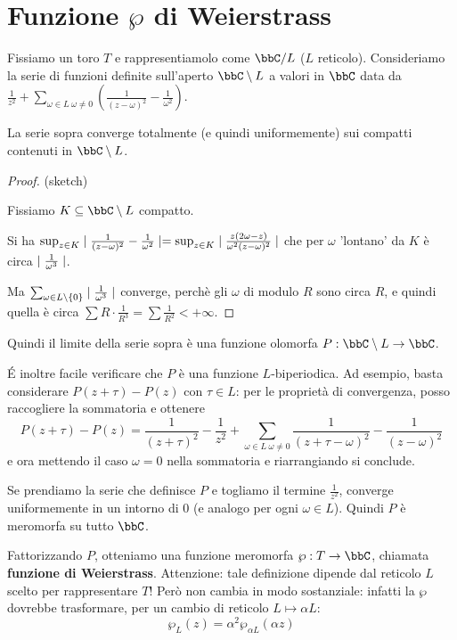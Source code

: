 \section{Funzione $\wp$ di Weierstrass}


Fissiamo un toro $T$ e rappresentiamolo come $\bbC/L$ ($L$ reticolo).
Consideriamo la serie di funzioni definite sull'aperto $\bbC\setminus L$ a valori in $\bbC$ data da $\frac{1}{z^2}+\sum_{\omega\in L\ \omega\not=0}(\frac{1}{(z-\omega)^2}-\frac{1}{\omega^2})$.

\begin{proposizione}
La serie sopra converge totalmente (e quindi uniformemente) sui compatti contenuti in $\bbC\setminus L$.
\end{proposizione}
\begin{proof}(sketch)

Fissiamo $K\subseteq\bbC\setminus L$ compatto.

Si ha $\sup_{z\in K}\mid \frac{1}{(z-\omega)^2}-\frac{1}{\omega^2} \mid=\sup_{z\in K}\mid \frac{z(2\omega-z)}{\omega^2(z-\omega)^2} \mid$ che per $\omega$ 'lontano' da $K$ è circa $\mid \frac{1}{\omega^3} \mid$.

Ma $\sum_{\omega\in L\setminus\{0\}}\mid \frac{1}{\omega^3} \mid$ converge, perchè
gli $\omega$ di modulo $R$ sono circa $R$, e quindi quella è circa $\sum R\cdot\frac{1}{R^3}=\sum\frac{1}{R^2}<+\infty$.
\end{proof}

Quindi il limite della serie sopra è una funzione olomorfa $P:\bbC\setminus L\rar\bbC$.

\'E inoltre facile verificare che $P$ è una funzione $L$-biperiodica.
Ad esempio, basta considerare $P(z+\tau)-P(z)$ con $\tau \in L$: per le proprietà di convergenza, posso raccogliere la sommatoria e ottenere
\[ P(z+\tau) - P(z) = \frac1{(z+\tau)^2} - \frac1{z^2} + \sum_{\omega \in L\ \omega\ne 0} \frac1{(z+\tau-\omega)^2}-\frac1{(z-\omega)^2}\]
e ora mettendo il caso $\omega=0$ nella sommatoria e riarrangiando si conclude.

Se prendiamo la serie che definisce $P$ e togliamo il termine $\frac{1}{z^2}$, converge uniformemente in un intorno di $0$ (e analogo per ogni $\omega\in L$).
Quindi $P$ è meromorfa su tutto $\bbC$.

Fattorizzando $P$, otteniamo una funzione meromorfa $\wp:T\rar\bbC$, chiamata \textbf{funzione di Weierstrass}. Attenzione: tale definizione dipende dal reticolo $L$ scelto per rappresentare $T$! Però non cambia in modo sostanziale: infatti la $\wp$ dovrebbe trasformare, per un cambio di reticolo $L \mapsto \alpha L$:
\[
 \wp_L(z) = \alpha^2 \wp_{\alpha L}(\alpha z)
\]

